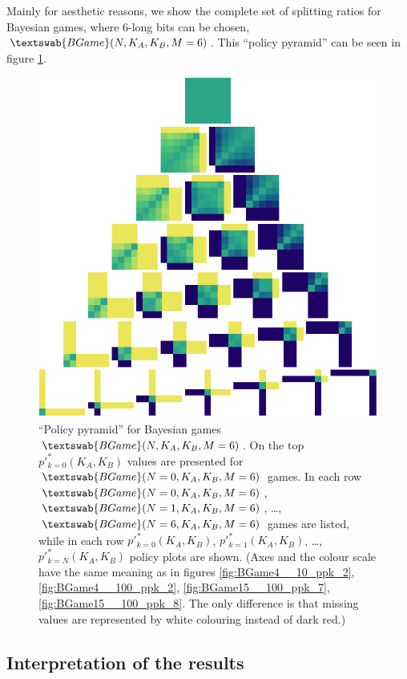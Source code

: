\documentclass{article}
\theoremstyle{definition}
\newcommand{\BG}[1]{$\textswab{BGame}(#1)$}
\begin{document}

Mainly for aesthetic reasons, we show the complete set of splitting ratios for Bayesian games, where 6-long bits can be chosen, \BG{N,K_A,K_B,M=6}.
This ``policy pyramid'' can be seen in figure \ref{fig:BayesianStrategyPyramid_6}.

\begin{figure}[H]
    \centering
    \includegraphics[width=10 cm]{img/BayesianPyramid_6.pdf}
    \caption{
    ``Policy pyramid'' for Bayesian games \BG{N,K_A,K_B,M=6}.
    On the top $p'^*_{k=0}(K_A,K_B)$ values are presented for \BG{N=0,K_A,K_B,M=6} games.
    In each row \BG{N=0,K_A,K_B,M=6}, \BG{N=1,K_A,K_B,M=6}, \dots, \BG{N=6,K_A,K_B,M=6} games are listed,
    while in each row $p'^*_{k=0}(K_A,K_B)$, $p'^*_{k=1}(K_A,K_B)$, \dots, $p'^*_{k=N}(K_A,K_B)$ policy plots are shown.
    (Axes and the colour scale have the same meaning as in figures \ref{fig:BGame4__10_ppk_2}, \ref{fig:BGame4__100_ppk_2}, \ref{fig:BGame15__100_ppk_7}, \ref{fig:BGame15__100_ppk_8}. The only difference is that missing values are represented by white colouring instead of dark red.)
    }
    \label{fig:BayesianStrategyPyramid_6}
\end{figure}




\subsection{Interpretation of the results}
\end{document}
